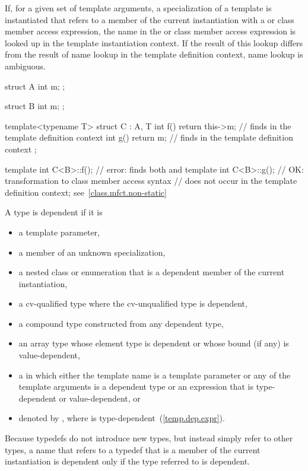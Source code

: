 \pnum
If, for a given set of template arguments, a specialization of a template is
instantiated that refers to a member of the current instantiation with a
 or class member access expression, the name in the
 or class member access expression is looked up in the
template instantiation context. If the result of this lookup differs from the
result of name lookup in the template definition context, name lookup is
ambiguous.
\enterexample
\begin{codeblock}
struct A {
  int m;
};

struct B {
  int m;
};

template<typename T>
struct C : A, T {
  int f() { return this->m; }  // finds  in the template definition context
  int g() { return m; }        // finds  in the template definition context
};

template int C<B>::f();        // error: finds both  and 
template int C<B>::g();        // OK: transformation to class member access syntax
                               // does not occur in the template definition context; see~\ref{class.mfct.non-static}
\end{codeblock}
\exitexample

\pnum
A type is dependent if it is
\begin{itemize}
\item
a template parameter,
\item
a member of an unknown specialization,
\item
a nested class or enumeration that is a dependent member of the current
instantiation,
\item
a cv-qualified type where the cv-unqualified type is dependent,
\item
a compound type constructed from any dependent type,
\item
an array type whose element type is dependent or whose
bound (if any) is value-dependent,
\item
a
in which either the template name is a template parameter or any of the
template arguments is a dependent type or an expression that is type-dependent
or value-dependent, or
\item denoted by \tcode{)},
where  is type-dependent~(\ref{temp.dep.expr}).
\end{itemize}

\pnum
\enternote
Because typedefs do not introduce new types, but
instead simply refer to other types, a name that refers to a
typedef that is a member of the current instantiation is dependent
only if the type referred to is dependent.
\exitnote

